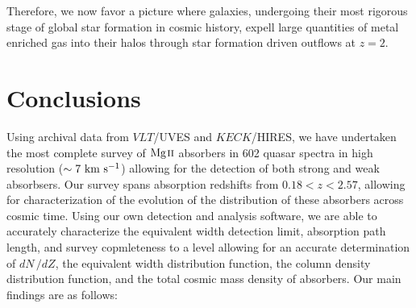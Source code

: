 \documentclass[iop,apj,numberedappendix,appendixfloats,twocolappendix]{emulateapj}
\begin{document}
Therefore, we now favor a picture where galaxies, undergoing their most rigorous stage of global star formation in cosmic history, expell large quantities of metal enriched gas into their halos through star formation driven outflows at $z = 2$. 


\section{Conclusions}
\label{sec:conclusions}

Using archival data from $VLT$/UVES and $KECK$/HIRES, we have undertaken the most complete survey of ${\hbox{{\rm Mg}\kern 0.1em{\sc ii}}}$ absorbers in 602 quasar spectra in high resolution ($\sim 7~\mathrm{\hbox{km~s$^{-1}$}}$) allowing for the detection of both strong and weak {\MgII} absorbsers. Our survey spans absorption redshifts from $0.18 < z < 2.57$, allowing for characterization of the evolution of the distribution of these absorbers across cosmic time. Using our own detection and analysis software, we are able to accurately characterize the equivalent width detection limit, absorption path length, and survey copmleteness to a level allowing for an accurate determination of $dN\,/dZ$, the equivalent width distribution function, the column density distribution function, and the total cosmic mass density of {\MgII} absorbers. Our main findings are as follows:
\end{document}
